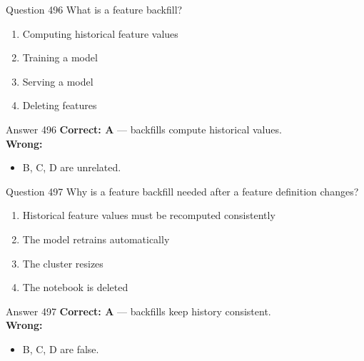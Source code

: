 \documentclass[aspectratio=169,11pt]{beamer}
\begin{document}
	\begin{frame}{Question 496}
		What is a feature backfill?
		\begin{enumerate}[label=\Alph*.]
			\item Computing historical feature values
			\item Training a model
			\item Serving a model
			\item Deleting features
		\end{enumerate}
	\end{frame}
	\begin{frame}{Answer 496}
		\textbf{Correct: A} --- backfills compute historical values.\\
		\vspace{0.5em}
		\textbf{Wrong:}
		\begin{itemize}
			\item B, C, D are unrelated.
		\end{itemize}
	\end{frame}
	
	\begin{frame}{Question 497}
		Why is a feature backfill needed after a feature definition changes?
		\begin{enumerate}[label=\Alph*.]
			\item Historical feature values must be recomputed consistently
			\item The model retrains automatically
			\item The cluster resizes
			\item The notebook is deleted
		\end{enumerate}
	\end{frame}
	\begin{frame}{Answer 497}
		\textbf{Correct: A} --- backfills keep history consistent.\\
		\vspace{0.5em}
		\textbf{Wrong:}
		\begin{itemize}
			\item B, C, D are false.
		\end{itemize}
	\end{frame}
	
\end{document}
